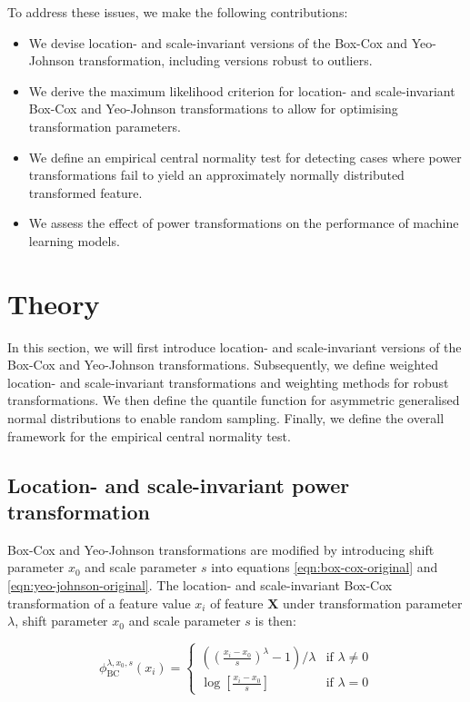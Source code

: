 \documentclass[preprint,12pt,authoryear]{elsarticle}
\begin{document}
To address these issues, we make the following contributions:

\begin{itemize}
\item
  We devise location- and scale-invariant versions of the Box-Cox and
  Yeo-Johnson transformation, including versions robust to outliers.
\item
  We derive the maximum likelihood criterion for location- and
  scale-invariant Box-Cox and Yeo-Johnson transformations to allow for
  optimising transformation parameters.
\item
  We define an empirical central normality test for detecting cases
  where power transformations fail to yield an approximately normally
  distributed transformed feature.
\item
  We assess the effect of power transformations on the performance of
  machine learning models.
\end{itemize}

\section{Theory}\label{theory}

In this section, we will first introduce location- and scale-invariant
versions of the Box-Cox and Yeo-Johnson transformations. Subsequently,
we define weighted location- and scale-invariant transformations and
weighting methods for robust transformations. We then define the
quantile function for asymmetric generalised normal distributions to
enable random sampling. Finally, we define the overall framework for the
empirical central normality test.

\subsection{Location- and scale-invariant power
transformation}\label{location--and-scale-invariant-power-transformation}

Box-Cox and Yeo-Johnson transformations are modified by introducing
shift parameter \(x_0\) and scale parameter \(s\) into equations
\ref{eqn:box-cox-original} and \ref{eqn:yeo-johnson-original}. The
location- and scale-invariant Box-Cox transformation of a feature value
\(x_i\) of feature \(\mathbf{X}\) under transformation parameter
\(\lambda\), shift parameter \(x_0\) and scale parameter \(s\) is then:

\begin{equation}
\label{eqn:box-cox-invariant}
\phi_{\text{BC}}^{\lambda, x_0, s} (x_i) = 
\begin{cases}
\left( \left(\frac{x_i - x_0}{s} \right)^\lambda - 1 \right) / \lambda & \text{if } \lambda \neq 0\\
\log\left[\frac{x_i - x_0}{s}\right] & \text{if } \lambda = 0
\end{cases}
\end{equation}
\end{document}
